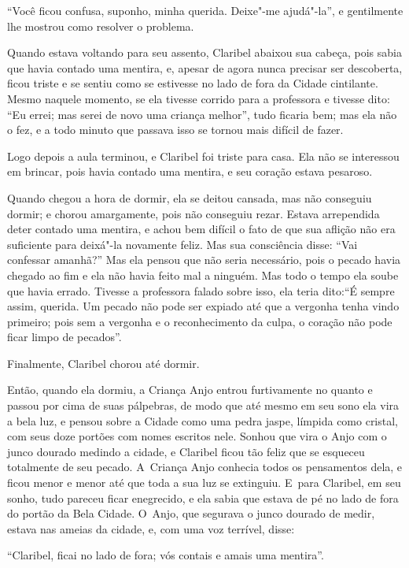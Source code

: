 ``Você ficou confusa, suponho, minha querida. Deixe"-me ajudá"-la'', e
gentilmente lhe mostrou como resolver o problema.

Quando estava voltando para seu assento, Claribel abaixou sua cabeça,
pois sabia que havia contado uma mentira, e, apesar de agora nunca
precisar ser descoberta, ficou triste e se sentiu como se estivesse no
lado de fora da Cidade cintilante. Mesmo naquele momento, se ela tivesse
corrido para a professora e tivesse dito: ``Eu errei; mas serei de novo
uma criança melhor'', tudo ficaria bem; mas ela não o fez, e a todo
minuto que passava isso se tornou mais difícil de fazer.

Logo depois a aula terminou, e Claribel foi triste para casa. Ela não se
interessou em brincar, pois havia contado uma mentira, e seu coração
estava pesaroso.

Quando chegou a hora de dormir, ela se deitou cansada, mas não conseguiu
dormir; e chorou amargamente, pois não conseguiu rezar. Estava
arrependida deter contado uma mentira, e achou bem difícil o fato de que
sua aflição não era suficiente para deixá"-la novamente feliz. Mas sua
consciência disse: ``Vai confessar amanhã?'' Mas ela pensou que não
seria necessário, pois o pecado havia chegado ao fim e ela não havia
feito mal a ninguém. Mas todo o tempo ela soube que havia errado.
Tivesse a professora falado sobre isso, ela teria dito:``É sempre assim,
querida. Um pecado não pode ser expiado até que a vergonha tenha vindo
primeiro; pois sem a vergonha e o reconhecimento da culpa, o coração não
pode ficar limpo de pecados''.

Finalmente, Claribel chorou até dormir.

Então, quando ela dormiu, a Criança Anjo entrou furtivamente no quanto e
passou por cima de suas pálpebras, de modo que até mesmo em seu sono ela
vira a bela luz, e pensou sobre a Cidade como uma pedra jaspe, límpida
como cristal, com seus doze portões com nomes escritos nele. Sonhou que
vira o Anjo com o junco dourado medindo a cidade, e Claribel ficou tão
feliz que se esqueceu totalmente de seu pecado. A~Criança Anjo conhecia
todos os pensamentos dela, e ficou menor e menor até que toda a sua luz
se extinguiu. E~para Claribel, em seu sonho, tudo pareceu ficar
enegrecido, e ela sabia que estava de pé no lado de fora do portão da
Bela Cidade. O~Anjo, que segurava o junco dourado de medir, estava nas
ameias da cidade, e, com uma voz terrível, disse:

``Claribel, ficai no lado de fora; vós contais e amais uma mentira''.

